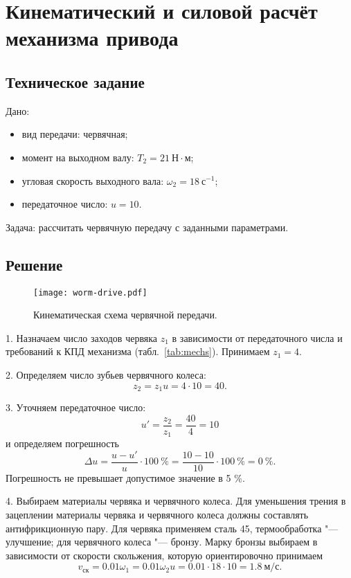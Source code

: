 \chapter{Кинематический и силовой расчёт механизма привода}

\section{Техническое задание}

Дано:
\begin{itemize}
    \item вид передачи: червячная;
    \item момент на выходном валу: $T_2 = 21~Н \cdot м$;
    \item угловая скорость выходного вала: $\omega_2 = 18~с^{-1}$;
    \item передаточное число: $u = 10$.
\end{itemize}

Задача: рассчитать червячную передачу с заданными параметрами.

\section{Решение}
\begin{wrapfigure}{l}{0.35\textwidth}
    \begin{center}
        \texttt{[image: worm-drive.pdf]}
        \caption{Кинематическая схема червячной передачи.}
        \label{fig:worm-drive}
    \end{center}
\end{wrapfigure}

1. Назначаем число заходов червяка $z_1$ в зависимости от передаточного числа и требований к КПД механизма (табл.~\ref{tab:mechs}). Принимаем $z_1 = 4$.

2. Определяем число зубьев червячного колеса:
\[
    z_2 = z_1 u = 4 \cdot 10 = 40.
\]

3. Уточняем передаточное число:
\[
    u' = \frac{z_2}{z_1} = \frac{40}{4} = 10
\]
и определяем погрешность
\[
    \Delta u = \frac{u - u'}{u} \cdot 100~\%
             = \frac{10 - 10}{10} \cdot 100~\%
             = 0~\%.
\]
Погрешность не превышает допустимое значение в 5 \%.

4. Выбираем материалы червяка и червячного колеса.
Для уменьшения трения в зацеплении материалы червяка и червячного колеса должны составлять антифрикционную пару.
Для червяка применяем сталь 45, термообработка "--- улучшение; для червячного колеса "--- бронзу.
Марку бронзы выбираем в зависимости от скорости скольжения, которую ориентировочно принимаем
\[
    v_\text{ск} = 0.01 \omega_1 = 0.01 \omega_2 u = 0.01 \cdot 18 \cdot 10 = 1.8~м/с.
\]

